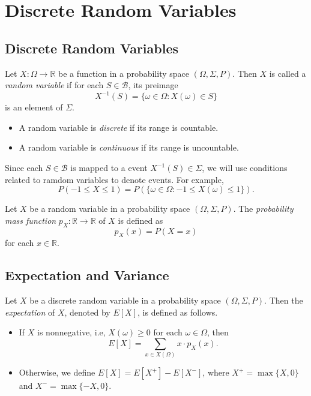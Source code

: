 \chapter{Discrete Random Variables}
\section{Discrete Random Variables}
\begin{definition}
  Let $X: \Omega \to \mathbb{R}$ be a function in a probability space
  $(\Omega, \Sigma, P)$.
  Then $X$ is called a \emph{random variable} if for each
  $S \in \mathcal{B}$, its preimage
  \begin{equation*}
    X^{-1}(S) = \{\omega \in \Omega : X(\omega) \in S\}
  \end{equation*}
  is an element of $\Sigma$.
  \begin{itemize}
    \item A random variable is \emph{discrete} if its range is countable.
    \item A random variable is \emph{continuous} if its range is uncountable.
  \end{itemize}
\end{definition}
\begin{remark}
  Since each $S \in \mathcal{B}$ is mapped to a event $X^{-1}(S) \in \Sigma$,
  we will use conditions related to ramdom variables to denote events.
  For example,
  \begin{equation*}
    P(-1 \leq X \leq 1) = P(\{\omega \in \Omega: -1 \leq X(\omega) \leq 1\}).
  \end{equation*}
\end{remark}

\begin{definition}
  Let $X$ be a random variable in a probability space $(\Omega, \Sigma, P)$.
  The \emph{probability mass function} $p_X: \mathbb{R} \to \mathbb{R}$ of $X$
  is defined as
  \begin{equation*}
    p_X(x) = P(X = x)
  \end{equation*}
  for each $x \in \mathbb{R}$.
\end{definition}

\section{Expectation and Variance}
\begin{definition}
  Let $X$ be a discrete random variable in a probability space
  $(\Omega, \Sigma, P)$.
  Then the \emph{expectation} of $X$, denoted by $E[X]$, is defined as
  follows.
  \begin{itemize}
    \item If $X$ is nonnegative, i.e, $X(\omega) \geq 0$ for each
      $\omega \in \Omega$, then
      \begin{equation*}
        E[X] = \sum_{x \in X(\Omega)} x \cdot p_X(x).
      \end{equation*}
    \item Otherwise, we define $E[X] = E[X^+] - E[X^-]$,
      where $X^+ = \max\{X, 0\}$ and $X^- = \max\{-X, 0\}$.
  \end{itemize}
\end{definition}

